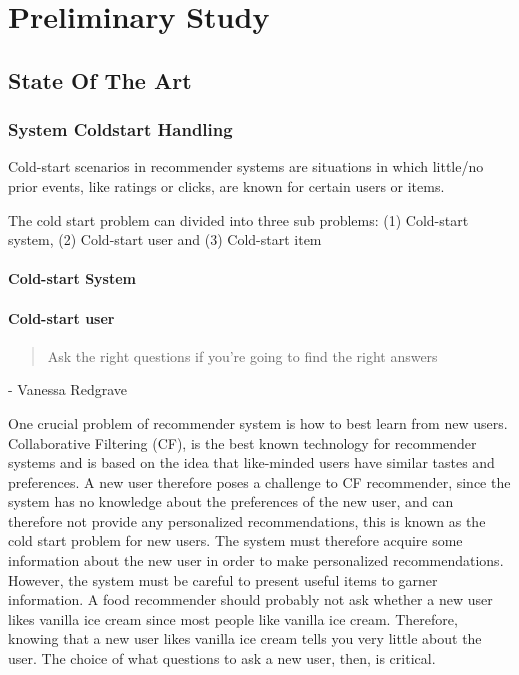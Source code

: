 
\chapter{Preliminary Study}
\minitoc

\clearpage

\section{State Of The Art}
\subsection{System Coldstart Handling}

Cold-start scenarios in recommender systems are situations in which little/no prior events, like ratings or clicks, are known for certain users or items.

The cold start problem can divided into three sub problems: (1) Cold-start system, (2) Cold-start user and (3) Cold-start item

\subsubsection{Cold-start System}



\subsubsection{Cold-start user}

\begin{quotation}
Ask the right questions if you're going to find the right answers
\end{quotation}
- Vanessa Redgrave


One crucial problem of recommender system is how to best learn from new users. Collaborative Filtering (CF), is the best known technology for recommender systems and is based on the idea that like-minded users have similar tastes and preferences. A new user therefore poses a challenge to CF recommender, since the system has no knowledge about the preferences of the new user, and can therefore not provide any personalized recommendations, this is known as the cold start problem for new users. The system must therefore acquire some information about the new user in order to make personalized recommendations. However, the system must be careful to present useful items to garner information. A food recommender should probably not ask whether a new user likes vanilla ice cream since most people like vanilla ice cream. Therefore, knowing that a new user likes vanilla ice cream tells you very little about the user. The choice of what questions to ask a new user, then, is critical.


